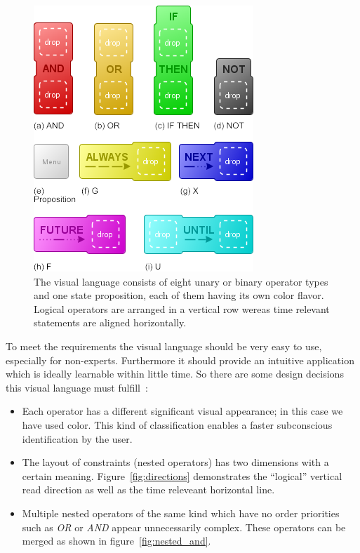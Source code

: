 \documentclass[conference]{IEEEtran}
\begin{document}
\begin{figure}[htbp]
  \centering
  \includegraphics[scale=0.5]{table}
  \caption{The visual language consists of eight unary or binary operator types and one state proposition, each of them having its own color flavor. Logical operators are arranged in a vertical row wereas time relevant statements are aligned horizontally.}
  \label{fig:operators}
\end{figure}



To meet the requirements the visual language should be very easy to use, especially for non-experts. Furthermore it should provide an intuitive application which is ideally learnable within little time. So there are some design decisions this visual language must fulfill~\cite{moody-physics-of-notations}:

\begin{itemize}
	\item Each operator has a different significant visual appearance; in this case we have used color. This kind of classification enables a faster subconscious identification by the user.
	\item The layout of constraints (nested operators) has two dimensions with a certain meaning. Figure~\ref{fig:directions} demonstrates the ``logical'' vertical read direction as well as the time releveant horizontal line.
	\item Multiple nested operators of the same kind which have no order priorities such as \emph{OR} or \emph{AND} appear unnecessarily complex. These operators can be merged as shown in figure~\ref{fig:nested_and}.
\end{itemize}
\end{document}
